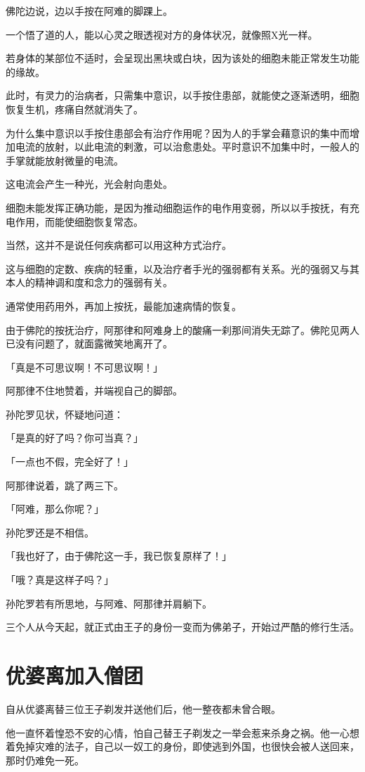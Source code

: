 \documentclass[twoside,openany]{book}
\begin{document}
佛陀边说，边以手按在阿难的脚踝上。

一个悟了道的人，能以心灵之眼透视对方的身体状况，就像照X光一样。

若身体的某部位不适时，会呈现出黑块或白块，因为该处的细胞未能正常发生功能的缘故。

此时，有灵力的治病者，只需集中意识，以手按住患部，就能使之逐渐透明，细胞恢复生机，疼痛自然就消失了。

为什么集中意识以手按住患部会有治疗作用呢？因为人的手掌会藉意识的集中而增加电流的放射，以此电流的剌激，可以治愈患处。平时意识不加集中时，一般人的手掌就能放射微量的电流。

这电流会产生一种光，光会射向患处。

细胞未能发挥正确功能，是因为推动细胞运作的电作用变弱，所以以手按抚，有充电作用，而能使细胞恢复常态。

当然，这并不是说任何疾病都可以用这种方式治疗。

这与细胞的定数、疾病的轻重，以及治疗者手光的强弱都有关系。光的强弱又与其本人的精神调和度和念力的强弱有关。

通常使用药用外，再加上按抚，最能加速病情的恢复。

由于佛陀的按抚治疗，阿那律和阿难身上的酸痛一刹那间消失无踪了。佛陀见两人已没有问题了，就面露微笑地离开了。

「真是不可思议啊！不可思议啊！」

阿那律不住地赞着，并端视自己的脚部。

孙陀罗见状，怀疑地问道：

「是真的好了吗？你可当真？」

「一点也不假，完全好了！」

阿那律说着，跳了两三下。

「阿难，那么你呢？」

孙陀罗还是不相信。

「我也好了，由于佛陀这一手，我已恢复原样了！」

「哦？真是这样子吗？」

孙陀罗若有所思地，与阿难、阿那律并肩躺下。

三个人从今天起，就正式由王子的身份一变而为佛弟子，开始过严酷的修行生活。

\section{优婆离加入僧团}\label{sec9.3}

自从优婆离替三位王子剃发并送他们后，他一整夜都未曾合眼。

他一直怀着惶恐不安的心情，怕自己替王子剃发之一举会惹来杀身之祸。他一心想着免掉灾难的法子，自己以一奴工的身份，即使逃到外国，也很快会被人送回来，那时仍难免一死。
\end{document}

